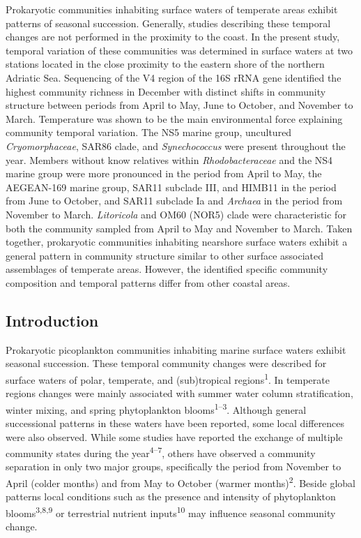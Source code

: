 \documentclass[
  12pt,
]{article}
\begin{document}
Prokaryotic communities inhabiting surface waters of temperate areas
exhibit patterns of seasonal succession. Generally, studies describing
these temporal changes are not performed in the proximity to the coast.
In the present study, temporal variation of these communities was
determined in surface waters at two stations located in the close
proximity to the eastern shore of the northern Adriatic Sea. Sequencing
of the V4 region of the 16S rRNA gene identified the highest community
richness in December with distinct shifts in community structure between
periods from April to May, June to October, and November to March.
Temperature was shown to be the main environmental force explaining
community temporal variation. The NS5 marine group, uncultured
\emph{Cryomorphaceae}, SAR86 clade, and \emph{Synechococcus} were
present throughout the year. Members without know relatives within
\emph{Rhodobacteraceae} and the NS4 marine group were more pronounced in
the period from April to May, the AEGEAN-169 marine group, SAR11
subclade III, and HIMB11 in the period from June to October, and SAR11
subclade Ia and \emph{Archaea} in the period from November to March.
\emph{Litoricola} and OM60 (NOR5) clade were characteristic for both the
community sampled from April to May and November to March. Taken
together, prokaryotic communities inhabiting nearshore surface waters
exhibit a general pattern in community structure similar to other
surface associated assemblages of temperate areas. However, the
identified specific community composition and temporal patterns differ
from other coastal areas.

\newpage

\hypertarget{introduction}{%
\subsection{Introduction}\label{introduction}}

Prokaryotic picoplankton communities inhabiting marine surface waters
exhibit seasonal succession. These temporal community changes were
described for surface waters of polar, temperate, and (sub)tropical
regions\textsuperscript{1}. In temperate regions changes were mainly
associated with summer water column stratification, winter mixing, and
spring phytoplankton blooms\textsuperscript{1--3}. Although general
successional patterns in these waters have been reported, some local
differences were also observed. While some studies have reported the
exchange of multiple community states during the
year\textsuperscript{4--7}, others have observed a community separation
in only two major groups, specifically the period from November to April
(colder months) and from May to October (warmer
months)\textsuperscript{2}. Beside global patterns local conditions such
as the presence and intensity of phytoplankton
blooms\textsuperscript{3,8,9} or terrestrial nutrient
inputs\textsuperscript{10} may influence seasonal community change.
\end{document}

